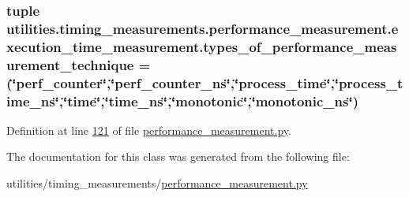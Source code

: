 \subsubsection[{types\+\_\+of\+\_\+performance\+\_\+measurement\+\_\+technique}]{\setlength{\rightskip}{0pt plus 5cm}tuple utilities.\+timing\+\_\+measurements.\+performance\+\_\+measurement.\+execution\+\_\+time\+\_\+measurement.\+types\+\_\+of\+\_\+performance\+\_\+measurement\+\_\+technique = (\char`\"{}perf\+\_\+counter\char`\"{},\char`\"{}perf\+\_\+counter\+\_\+ns\char`\"{},\char`\"{}process\+\_\+time\char`\"{},\char`\"{}process\+\_\+time\+\_\+ns\char`\"{},\char`\"{}time\char`\"{},\char`\"{}time\+\_\+ns\char`\"{},\char`\"{}monotonic\char`\"{},\char`\"{}monotonic\+\_\+ns\char`\"{})\hspace{0.3cm}{\ttfamily [static]}}\label{classutilities_1_1timing__measurements_1_1performance__measurement_1_1execution__time__measurement_a80ff3ce9b405f5d8c2e63294348ca6dc}


Definition at line \hyperlink{performance__measurement_8py_source_l00121}{121} of file \hyperlink{performance__measurement_8py_source}{performance\+\_\+measurement.\+py}.



The documentation for this class was generated from the following file\+:\begin{DoxyCompactItemize}
\item 
utilities/timing\+\_\+measurements/\hyperlink{performance__measurement_8py}{performance\+\_\+measurement.\+py}\end{DoxyCompactItemize}

